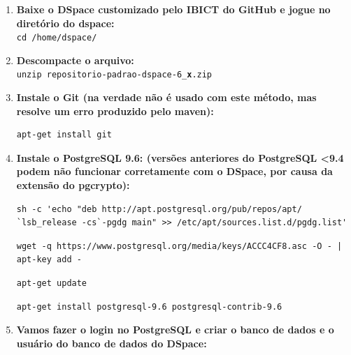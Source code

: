 \documentclass[12pt,hidelinks]{article}
\begin{document}
\begin{enumerate}
        \item \textbf{Baixe o DSpace customizado pelo IBICT do GitHub e jogue no diretório do dspace:}\\
        
            \texttt{cd /home/dspace/}\\
        
        \item \textbf{Descompacte o arquivo:}\\
        
            \texttt{unzip repositorio-padrao-dspace-6\_\textbf{x}.zip}\\
            
        \item \textbf{Instale o Git (na verdade não é usado com este método, mas resolve um erro produzido pelo maven):}\\    
            
            \begin{verbatim}
apt-get install git
            \end{verbatim}
            
        \item \textbf{Instale o PostgreSQL 9.6: (versões anteriores do PostgreSQL <9.4 podem não funcionar corretamente com o DSpace, por causa da extensão do pgcrypto):}\\
            
        \begin{verbatim}
sh -c 'echo "deb http://apt.postgresql.org/pub/repos/apt/ 
`lsb_release -cs`-pgdg main" >> /etc/apt/sources.list.d/pgdg.list'
        \end{verbatim}

       \begin{verbatim}
wget -q https://www.postgresql.org/media/keys/ACCC4CF8.asc -O - | apt-key add -
       \end{verbatim}
      
       \begin{verbatim}
apt-get update
       \end{verbatim}
            
        \begin{verbatim}
apt-get install postgresql-9.6 postgresql-contrib-9.6
       \end{verbatim}


        \item \textbf{Vamos fazer o login no PostgreSQL e criar o banco de dados e o usuário do banco de dados do DSpace:}\\
        

\end{enumerate}
\end{document}
